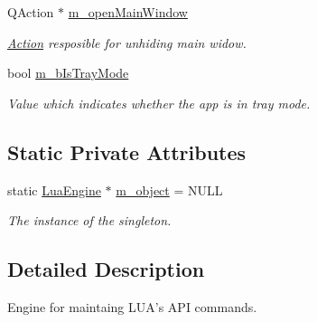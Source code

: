 \begin{DoxyCompactItemize}
Q\-Action $\ast$ \hyperlink{class_lua_engine_ab809b8024722da330a92284b2c01b66a}{m\-\_\-open\-Main\-Window}
\begin{DoxyCompactList}\small\item\em \hyperlink{class_action}{Action} resposible for unhiding main widow. \end{DoxyCompactList}\item 
bool \hyperlink{class_lua_engine_adf80abf3a5f6528dbe5f57e306f60af0}{m\-\_\-b\-Is\-Tray\-Mode}
\begin{DoxyCompactList}\small\item\em Value which indicates whether the app is in tray mode. \end{DoxyCompactList}\end{DoxyCompactItemize}
\subsection*{Static Private Attributes}
\begin{DoxyCompactItemize}
\item 
static \hyperlink{class_lua_engine}{Lua\-Engine} $\ast$ \hyperlink{class_lua_engine_a27899d8e22a8da3067519562500b9c7f}{m\-\_\-object} = N\-U\-L\-L
\begin{DoxyCompactList}\small\item\em The instance of the singleton. \end{DoxyCompactList}\end{DoxyCompactItemize}


\subsection{Detailed Description}
Engine for maintaing L\-U\-A's A\-P\-I commands. 

